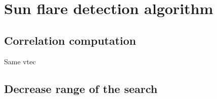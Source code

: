 \chapter{Sun flare detection algorithm}

\section{Correlation computation}

Same vtec

\section{Decrease range of the search}